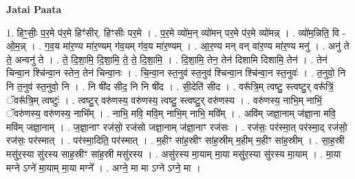 \documentclass[17pt]{extarticle}
\begin{document}
\textbf{Jatai Paata} \newline

1. हिꣳ॒॒सीः॒ प॒र॒मे प॑र॒मे हिꣳ॑सीर्. हिꣳसीः पर॒मे । . प॒र॒मे व्यो॑म॒न् व्यो॑मन् पर॒मे प॑र॒मे व्यो॑मन्न् । . व्यो॑म॒न्निति॒ वि - ओ॒म॒न्न् । . ग॒व॒य मा॑र॒ण्य मा॑र॒ण्यम् ग॑व॒यम् ग॑व॒य मा॑र॒ण्यम् । . आ॒र॒ण्य मन् वन् वा॑र॒ण्य मा॑र॒ण्य मनु॑ । . अनु॑ ते ते॒ अन्वनु॑ ते । . ते॒ दि॒शा॒मि॒ दि॒शा॒मि॒ ते॒ ते॒ दि॒शा॒मि॒ । . दि॒शा॒मि॒ तेन॒ तेन॑ दिशामि दिशामि॒ तेन॑ । . तेन॑ चिन्वा॒न श्चि॑न्वा॒न स्तेन॒ तेन॑ चिन्वा॒नः । . चि॒न्वा॒न स्त॒नुव॑ स्त॒नुव॑ श्चिन्वा॒न श्चि॑न्वा॒न स्त॒नुवः॑ । . त॒नुवो॒ नि नि त॒नुव॑ स्त॒नुवो॒ नि । . नि षी॑द सीद॒ नि नि षी॑द । . सी॒देति॑ सीद । . वरू᳚त्रि॒म् त्वष्टु॒ स्त्वष्टु॒र् वरू᳚त्रिं॒ ॅवरू᳚त्रि॒म् त्वष्टुः॑ । . त्वष्टु॒र् वरु॑णस्य॒ वरु॑णस्य॒ त्वष्टु॒ स्त्वष्टु॒र् वरु॑णस्य । . वरु॑णस्य॒ नाभि॒म् नाभिं॒ ॅवरु॑णस्य॒ वरु॑णस्य॒ नाभि᳚म् । . नाभि॒ मवि॒ मवि॒म् नाभि॒म् नाभि॒ मवि᳚म् । . अवि॑म् जज्ञा॒नाम् ज॑ज्ञा॒ना मवि॒ मवि॑म् जज्ञा॒नाम् । . ज॒ज्ञा॒नाꣳ रज॑सो॒ रज॑सो जज्ञा॒नाम् ज॑ज्ञा॒नाꣳ रज॑सः । . रज॑सः॒ पर॑स्मा॒त् पर॑स्मा॒द् रज॑सो॒ रज॑सः॒ पर॑स्मात् । . पर॑स्मा॒दिति॒ पर॑स्मात् । . म॒हीꣳ सा॑ह॒स्रीꣳ सा॑ह॒स्रीम् म॒हीम् म॒हीꣳ सा॑ह॒स्रीम् । . सा॒ह॒स्री मसु॑र॒स्या सु॑रस्य साह॒स्रीꣳ सा॑ह॒स्री मसु॑रस्य । . असु॑रस्य मा॒याम् मा॒या मसु॑र॒स्या सु॑रस्य मा॒याम् । . मा॒या मग्ने ऽग्ने॑ मा॒याम् मा॒या मग्ने᳚ । . अग्ने॒ मा मा ऽग्ने ऽग्ने॒ मा । \newline
\end{document}
